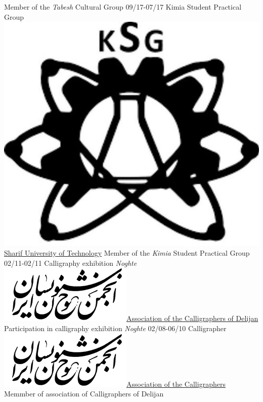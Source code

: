 \documentclass[a4paper]{friggeri-cv}
\begin{document}
\begin{entrylist}
     {Member of the \emph{Tabesh} Cultural Group}
    \entry
    {09/17-07/17}
    {   Kimia Student Practical Group}
    {\href{http://www.sharif.ir/}{\includegraphics[scale=0.03]{../assets/images/Kimia_logo.jpg} Sharif University of Technology}}
    {Member of the \emph{Kimia} Student Practical Group}
    \entry
    {02/11-02/11}
    {    Calligraphy exhibition \emph{Noghte}}
    {\href{http://calligraphers.ir/}{\includegraphics[scale=0.15]{../assets/images/Khoshnevisan_logo.png}Association of the Calligraphers of Delijan}}
    {Participation in calligraphy exhibition \emph{Noghte}}
    \entry
    {02/08-06/10}
    {   Calligrapher}
    {\href{http://calligraphers.ir/}{\includegraphics[scale=0.15]{../assets/images/Khoshnevisan_logo.png}Association of the Calligraphers}}
    {Memmber of association of Calligraphers of Delijan}
\end{entrylist}
\\
\end{document}
